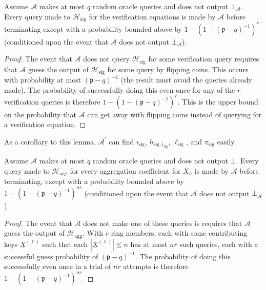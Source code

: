 \documentclass{iacrtrans}
\theoremstyle{definition}
\numberwithin{theorem}{subsection}
\numberwithin{lemma}{theorem}
\newcommand{\adversary}{\mathcal{A}}
\newcommand{\p}{\mathfrak{p}}
\begin{document}


\begin{lemma}
Assume $\adversary$ makes at most $q$ random oracle queries and does not output $\bot_\adversary$. Every query made to $\mathcal{H}_{\text{sig}}$ for the verification equations is made by $\adversary$ before terminating except with a probability bounded above by $1 - (1-(\p - q)^{-1})^{r}$ (conditioned upon the event that $\adversary$ does not output $\bot_\adversary$).
\end{lemma}
\begin{proof}
The event that $\adversary$ does not query $\mathcal{H}_{\text{sig}}$ for some verification query requires that $\adversary$ guess the output of $\mathcal{H}_{\text{sig}}$ for some query by flipping coins. This occurs with probability at most $(\p - q)^{-1}$ (the result must avoid the queries already made). The probability of successfully doing this even once for any of the $r$ verification queries is therefore $1 - (1 - (\p - q)^{-1})^{r}$. This is the upper bound on the probability that $\adversary$ can get away with flipping coins instead of querying for a verification equation.
\end{proof}

As a corollary to this lemma, $\adversary^\prime$ can find $i_{\text{sig}}$, $h_{\text{sig}, i_{\text{sig}}}$, $\ell_{\text{sig}}$, and $\pi_{\text{sig}}$ easily.

\begin{lemma}
Assume $\adversary$ makes at most $q$ random oracle queries and does not output $\bot$. Every query made to $\mathcal{H}_{\text{agg}}$ for every aggregation coefficient for $X_h$ is made by $\adversary$ before terminating, except with a probability bounded above by $1 - (1- (\p - q)^{-1})^{nr}$ (conditioned upon the event that $\adversary$ does not output $\bot_\adversary$).
\end{lemma}
\begin{proof}
The event that $\adversary$ does not make one of these queries is requires that $\adversary$ guess the output of $\mathcal{H}_{\text{agg}}$. With $r$ ring members, each with some contributing keys $\underline{X}^{(\ell)}$ such that each $\left|\underline{X}^{(\ell)}\right| \leq n$ has at most $nr$ such queries, each with a successful guess probability of $(\p - q)^{-1}$. The probability of doing this successfully even once in a trial of $nr$ attempts is therefore $1 - (1- (\p - q)^{-1})^{nr}$.
\end{proof}
\end{document}

